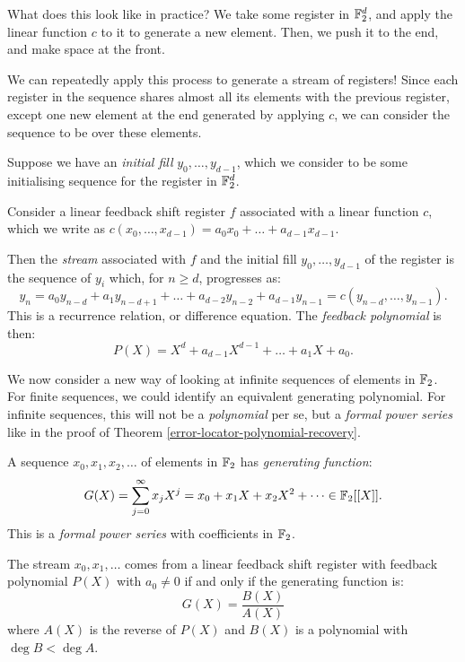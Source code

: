 \documentclass{article}
\begin{document}
What does this look like in practice? We take some register in $\mathbb{F}_2^d$, and apply the linear function $c$ to it to generate a new element. Then, we push it to the end, and make space at the front.


We can repeatedly apply this process to generate a stream of registers! Since each register in the sequence shares almost all its elements with the previous register, except one new element at the end generated by applying $c$, we can consider the sequence to be over these elements.

\begin{definition}
    Suppose we have an \textit{initial fill} $y_0, \dots, y_{d-1}$, which we consider to be some initialising sequence for the register in $\mathbb{F}_2^d$.
    
    Consider a linear feedback shift register $f$ associated with a linear function $c$, which we write as $c(x_0, \dots, x_{d-1}) = a_0 x_0 + \dots + a_{d-1} x_{d-1}$.
    
	Then the \textit{stream} associated with $f$ and the initial fill $y_0, \dots, y_{d-1}$ of the register is the sequence of $y_i$ which, for $n \geq d$, progresses as:
	\[
	y_n = a_0 y_{n-d} + a_1 y_{n-d+1} + \dots + a_{d-2} y_{n-2} + a_{d-1}y_{n-1}
	= c(y_{n-d}, \dots, y_{n-1}).
	\]
	This is a recurrence relation, or difference equation. The \textit{feedback polynomial} is then:
	\[
	P(X) = X^d + a_{d-1} X^{d-1} + \dots + a_1 X + a_0.
	\]
\end{definition}

We now consider a new way of looking at infinite sequences of elements in $\mathbb{F}_2$. For finite sequences, we could identify an equivalent generating polynomial. For infinite sequences, this will not be a \textit{polynomial} per se, but a \textit{formal power series} like in the proof of Theorem \ref{error-locator-polynomial-recovery}.

\begin{definition}
    A sequence $x_0, x_1, x_2, \dots$ of elements in $\mathbb{F}_2$ has \textit{generating function}:
    \[
	G(X) = \sum_{j=0}^\infty x_j X^j = x_0 + x_1X + x_2X^2 + \dots \in \mathbb{F}_2[[X]].
	\]
	This is a \textit{formal power series} with coefficients in $\mathbb{F}_2$.
\end{definition}

\begin{theorem}
    The stream $x_0, x_1, \dots$ comes from a linear feedback shift register with feedback polynomial $P(X)$ with $a_0 \neq 0$ if and only if the generating function is:
    \[
	G(X) = \frac{B(X)}{A(X)}
	\]
	where $A(X)$ is the reverse of $P(X)$ and $B(X)$ is a polynomial with $\deg B < \deg A$.
\end{theorem}
\end{document}
